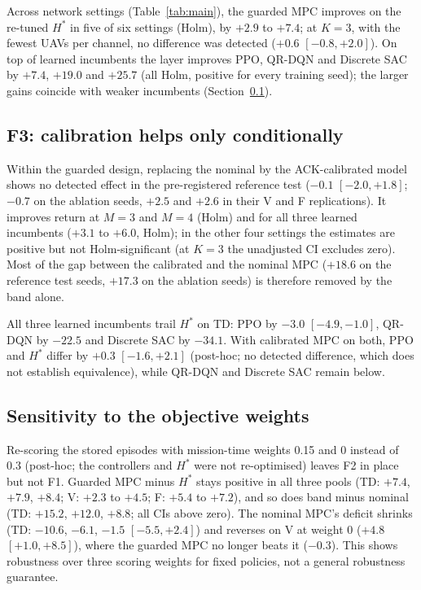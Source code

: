\documentclass[final,3p,times,twocolumn]{elsarticle}
\begin{document}
Across network settings (Table~\ref{tab:main}), the guarded MPC improves on the re-tuned
$H^*$ in five of six settings (Holm), by $+2.9$ to $+7.4$; at $K{=}3$, with the fewest UAVs per channel, no difference
was detected ($+0.6$ $[-0.8,+2.0]$). On top of learned incumbents the layer improves PPO, QR-DQN and Discrete SAC by
$+7.4$, $+19.0$ and $+25.7$ (all Holm, positive for every training seed); the larger gains coincide with weaker
incumbents (Section~\ref{sec:f3}).

\subsection{F3: calibration helps only conditionally}\label{sec:f3}
Within the guarded design, replacing the nominal by the ACK-calibrated model shows no detected effect in the
pre-registered reference test ($-0.1$ $[-2.0,+1.8]$; $-0.7$ on the ablation seeds, $+2.5$ and $+2.6$ in their V and F
replications). It improves return at $M{=}3$ and $M{=}4$ (Holm) and for all three learned incumbents ($+3.1$ to
$+6.0$, Holm); in the other four settings the estimates are positive but not Holm-significant (at $K{=}3$ the
unadjusted CI excludes zero). Most of the gap between the calibrated and the nominal MPC ($+18.6$ on the reference
test seeds, $+17.3$ on the ablation seeds) is therefore removed by the band alone.

All three learned incumbents trail $H^*$ on TD: PPO by $-3.0$ $[-4.9,-1.0]$, QR-DQN by $-22.5$ and Discrete SAC by
$-34.1$. With calibrated MPC on both, PPO and $H^*$ differ by $+0.3$ $[-1.6,+2.1]$ (post-hoc; no detected difference,
which does not establish equivalence), while QR-DQN and Discrete SAC remain below.

\subsection{Sensitivity to the objective weights}\label{sec:weights}
Re-scoring the stored episodes with mission-time weights 0.15 and 0 instead of 0.3 (post-hoc; the controllers and
$H^*$ were not re-optimised) leaves F2 in place but not F1. Guarded MPC minus $H^*$ stays positive in all three pools
(TD: $+7.4$, $+7.9$, $+8.4$; V: $+2.3$ to $+4.5$; F: $+5.4$ to $+7.2$), and so does band minus nominal (TD: $+15.2$,
$+12.0$, $+8.8$; all CIs above zero). The nominal MPC's deficit shrinks (TD: $-10.6$, $-6.1$, $-1.5$ $[-5.5,+2.4]$) and
reverses on V at weight 0 ($+4.8$ $[+1.0,+8.5]$), where the guarded MPC no longer beats it ($-0.3$). This shows
robustness over three scoring weights for fixed policies, not a general robustness guarantee.
\end{document}
